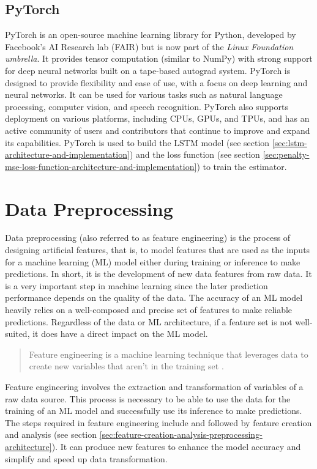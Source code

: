   \subsection{PyTorch}
  \label{sec:pytorch-third-party}
    PyTorch \cite{the-linux-foundationPyTorch} is an open-source machine learning library for Python, developed by Facebook's AI Research lab (FAIR) but is now part of the \emph{Linux Foundation umbrella}. It provides tensor computation (similar to NumPy) with strong support for deep neural networks built on a tape-based autograd system. PyTorch is designed to provide flexibility and ease of use, with a focus on deep learning and neural networks. It can be used for various tasks such as natural language processing, computer vision, and speech recognition.
    PyTorch also supports deployment on various platforms, including CPUs, GPUs, and TPUs, and has an active community of users and contributors that continue to improve and expand its capabilities.
    PyTorch is used to build the LSTM model (see section \ref{sec:lstm-architecture-and-implementation}) and the loss function (see section \ref{sec:penalty-mse-loss-function-architecture-and-implementation}) to train the estimator.


\section{Data Preprocessing}
\label{sec:feature-engineering-data-preprocessing-architecture}

  Data preprocessing (also referred to as feature engineering) is the process of designing artificial features, that is, to model features that are used as the inputs for a machine learning (ML) model either during training or inference to make predictions. In short, it is the development of new data features from raw data.
  It is a very important step in machine learning since the later prediction performance depends on the quality of the data.
  The accuracy of an ML model heavily relies on a well-composed and precise set of features to make reliable predictions. Regardless of the data or ML architecture, if a feature set is not well-suited, it does have a direct impact on the ML model.
  \begin{quote}
    Feature engineering is a machine learning technique that leverages data to create new variables that aren't in the training set \cite{patelWhatFeatureEngineering2021}.
  \end{quote}
  Feature engineering involves the extraction and transformation of variables of a raw data source. This process is necessary to be able to use the data for the training of an ML model and successfully use its inference to make predictions.
  The steps required in feature engineering include  and  followed by feature creation and analysis (see section \ref{sec:feature-creation-analysis-preprocessing-architecture}).
  It can produce new features to enhance the model accuracy and simplify and speed up data transformation.

